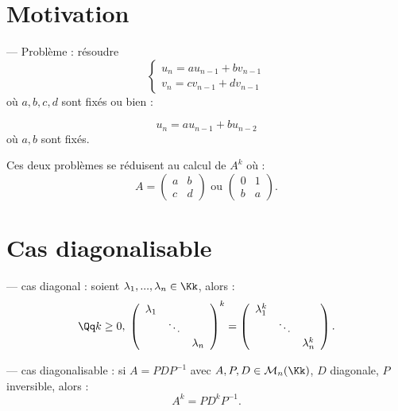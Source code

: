 \documentclass[class=report,crop=false]{standalone}
\begin{document}
\section{Motivation}

--- Problème : résoudre \[
\left\{ \begin{array}{l}
u_{n}=au_{n-1}+ bv_{n-1} \\ v_n =cv_{n-1} + dv_{n-1}
\end{array}\right. \]où $a,b,c,d$ sont fixés ou bien :

\[u_n = au_{n-1} + bu_{n-2}\]
où $a,b$ sont fixés.

Ces deux problèmes se réduisent au calcul de $A^k$ où :
\[A = \left(\begin{array}{cc}
a & b \\
c& d
\end{array}\right)\mbox{ ou } \left(\begin{array}{cc}
0 & 1 \\
b& a
\end{array}\right).\]

\section{Cas diagonalisable}

--- cas diagonal : soient $\lambda_1,...,\lambda_n \in \Kk$, alors :
\[\Qq k \ge 0,\; \left(\begin{array}{ccc}
\lambda_1 && \\
&\ddots & \\
&&\lambda_n
\end{array}\right)^k = \left(\begin{array}{ccc}
\lambda_1^k & &\\
&\ddots &\\
&&\lambda_n^k
\end{array}\right).\] 



--- cas diagonalisable : si $A = PDP^{-1}$ avec $A,P,D\in \mathcal{M}_n(\Kk)$, $D$ diagonale, $P$ inversible, alors :
\[A^k=PD^kP^{-1}.\]
\end{document}
